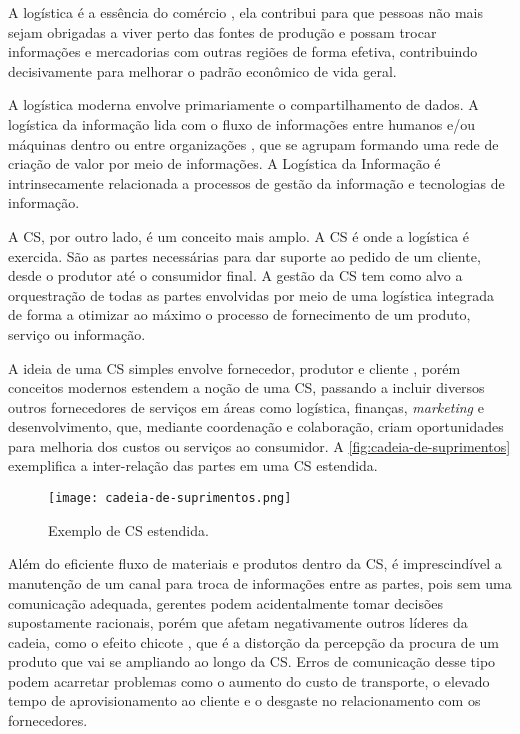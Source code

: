 A logística é a essência do comércio \cite{ballou2006cadeiasuprimentos}, ela contribui para que pessoas não mais sejam obrigadas a viver perto das fontes de produção e possam trocar informações e mercadorias com outras regiões de forma efetiva, contribuindo decisivamente para melhorar o padrão econômico de vida geral.

A logística moderna envolve primariamente o compartilhamento de dados. A logística da informação lida com o fluxo de informações entre humanos e/ou máquinas dentro ou entre organizações \cite{haftor2011information}, que se agrupam formando uma rede de criação de valor por meio de informações. A Logística da Informação é intrinsecamente relacionada a processos de gestão da informação e tecnologias de informação.

A CS, por outro lado, é um conceito mais amplo. A CS é onde a logística é exercida. São as partes necessárias para dar suporte ao pedido de um cliente, desde o produtor até o consumidor final. A gestão da CS tem como alvo a orquestração de todas as partes envolvidas por meio de uma logística integrada de forma a otimizar ao máximo o processo de fornecimento de um produto, serviço ou informação.

A ideia de uma CS simples envolve fornecedor, produtor e cliente \cite{hugos2018supplychain}, porém conceitos modernos estendem a noção de uma CS, passando a incluir diversos outros fornecedores de serviços em áreas como logística, finanças, \textit{marketing} e desenvolvimento, que, mediante coordenação e colaboração, criam oportunidades para melhoria dos custos ou serviços ao consumidor. A \autoref{fig:cadeia-de-suprimentos} exemplifica a inter-relação das partes em uma CS estendida.

\begin{figure}[t]
	\centering
	\texttt{[image: cadeia-de-suprimentos.png]}
	\caption{Exemplo de CS estendida.}
	\label{fig:cadeia-de-suprimentos}
\end{figure}

Além do eficiente fluxo de materiais e produtos dentro da CS, é imprescindível a manutenção de um canal para troca de informações entre as partes, pois sem uma comunicação adequada, gerentes podem acidentalmente tomar decisões supostamente racionais, porém que afetam negativamente outros líderes da cadeia, como o efeito chicote \cite{lee1997bullwhip}, que é a distorção da percepção da procura de um produto que vai se ampliando ao longo da CS. Erros de comunicação desse tipo podem acarretar problemas como o aumento do custo de transporte, o elevado tempo de aprovisionamento ao cliente e o desgaste no relacionamento com os fornecedores.

